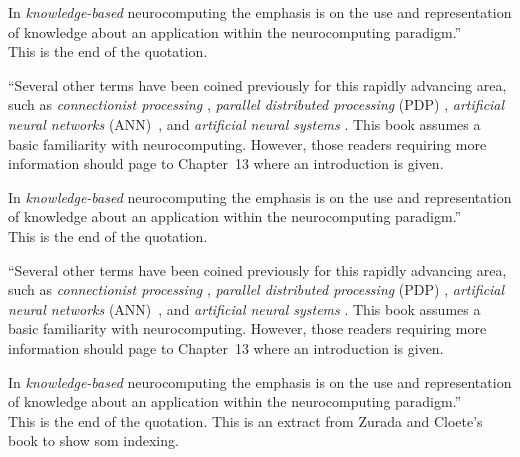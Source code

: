 In \emph{knowledge-based}  neurocomputing the emphasis is on the use 
and representation of knowledge about an application within the 
neurocomputing paradigm.''\\

This is the end of the quotation.

``Several other terms have 
been coined previously for this rapidly advancing area, such as 
\emph{connectionist processing} 
\citep{shas95}, 
\emph{parallel distributed processing}
(PDP) \citep{rume86},
\emph{artificial neural networks}
(ANN)~\citep{hass95,roja96},
and 
\emph{artificial neural systems}
\citep{zurada92}.
This book assumes a basic familiarity with neurocomputing. However, 
those readers requiring more information should page to Chapter~13 
where an introduction is given.

In \emph{knowledge-based}  neurocomputing the emphasis is on the use 
and representation of knowledge about an application within the 
neurocomputing paradigm.''\\

This is the end of the quotation.

``Several other terms have 
been coined previously for this rapidly advancing area, such as 
\emph{connectionist processing} 
\citep{shas95}, 
\emph{parallel distributed processing}
(PDP) \citep{rume86},
\emph{artificial neural networks}
(ANN)~\citep{hass95,roja96},
and 
\emph{artificial neural systems}
\citep{zurada92}.
This book assumes a basic familiarity with neurocomputing. However, 
those readers requiring more information should page to Chapter~13 
where an introduction is given.

In \emph{knowledge-based}  neurocomputing the emphasis is on the use 
and representation of knowledge about an application within the 
neurocomputing paradigm.''\\

This is the end of the quotation.
This is an extract from Zurada and Cloete's book to show som indexing.\\
